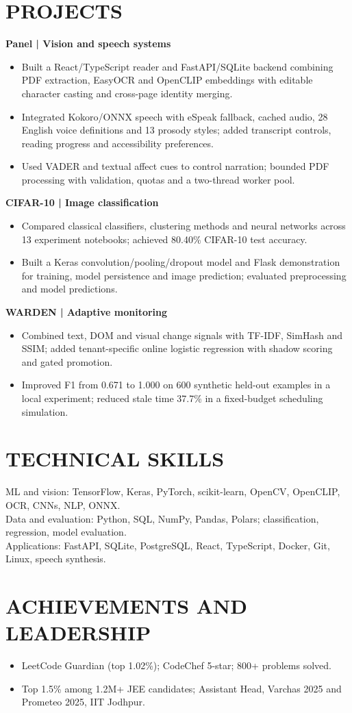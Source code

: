 \documentclass[10pt,a4paper]{article}
\begin{document}
\section*{PROJECTS}
\textbf{Panel | Vision and speech systems}
\begin{itemize}
\item Built a React/TypeScript reader and FastAPI/SQLite backend combining PDF extraction, EasyOCR and OpenCLIP embeddings with editable character casting and cross-page identity merging.
\item Integrated Kokoro/ONNX speech with eSpeak fallback, cached audio, 28 English voice definitions and 13 prosody styles; added transcript controls, reading progress and accessibility preferences.
\item Used VADER and textual affect cues to control narration; bounded PDF processing with validation, quotas and a two-thread worker pool.
\end{itemize}
\textbf{CIFAR-10 | Image classification}
\begin{itemize}
\item Compared classical classifiers, clustering methods and neural networks across 13 experiment notebooks; achieved 80.40\% CIFAR-10 test accuracy.
\item Built a Keras convolution/pooling/dropout model and Flask demonstration for training, model persistence and image prediction; evaluated preprocessing and model predictions.
\end{itemize}
\textbf{WARDEN | Adaptive monitoring}
\begin{itemize}
\item Combined text, DOM and visual change signals with TF-IDF, SimHash and SSIM; added tenant-specific online logistic regression with shadow scoring and gated promotion.
\item Improved F1 from 0.671 to 1.000 on 600 synthetic held-out examples in a local experiment; reduced stale time 37.7\% in a fixed-budget scheduling simulation.
\end{itemize}
\section*{TECHNICAL SKILLS}
ML and vision: TensorFlow, Keras, PyTorch, scikit-learn, OpenCV, OpenCLIP, OCR, CNNs, NLP, ONNX.\\[2pt]
Data and evaluation: Python, SQL, NumPy, Pandas, Polars; classification, regression, model evaluation.\\[2pt]
Applications: FastAPI, SQLite, PostgreSQL, React, TypeScript, Docker, Git, Linux, speech synthesis.
\section*{ACHIEVEMENTS AND LEADERSHIP}
\begin{itemize}
\item LeetCode Guardian (top 1.02\%); CodeChef 5-star; 800+ problems solved.
\item Top 1.5\% among 1.2M+ JEE candidates; Assistant Head, Varchas 2025 and Prometeo 2025, IIT Jodhpur.
\end{itemize}
\end{document}
